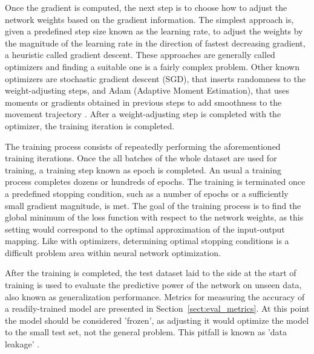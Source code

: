 \documentclass{article}
\begin{document}
Once the gradient is computed, the next step is to choose how to adjust the network weights 
based on the gradient information. The simplest approach is, given a predefined step size 
known as the learning rate, to adjust the weights by the magnitude of the learning rate 
in the direction of fastest decreasing gradient, a heuristic called gradient descent. These approaches 
are generally called optimizers and finding a suitable one is a fairly complex problem.
Other known optimizers are stochastic gradient descent (SGD), that inserts randomness 
to the weight-adjusting steps, and Adam (Adaptive Moment Estimation), that 
uses moments or gradients obtained in previous steps to add smoothness to the 
movement trajectory \cite{princebook}. After a weight-adjusting step is completed 
with the optimizer, the training iteration is completed.

The training process consists of repeatedly performing the aforementioned training 
iterations. Once the all batches of the whole dataset are used for training,
a training step known as epoch is completed. An usual a training process 
completes dozens or hundreds of epochs. The training is terminated once a predefined 
stopping condition, such as a number of epochs or a sufficiently small gradient 
magnitude, is met. The goal of the training process is to find the global minimum of the loss 
function with respect to the network weights, as this setting would correspond to 
the optimal approximation of the input-output mapping. Like with optimizers, 
determining optimal stopping conditions is a difficult problem area within neural network optimization.

After the training is completed, the test dataset laid to the side at the start of 
training is used to evaluate the predictive power of the network on unseen data, 
also known as generalization performance. Metrics for measuring the accuracy 
of a readily-trained model are presented in Section~\ref{sect:eval_metrics}.
At this point the model should be considered 'frozen', as adjusting it would 
optimize the model to the small test set, not the general problem. This pitfall is 
known as 'data leakage' \cite{engbook}.
\end{document}
